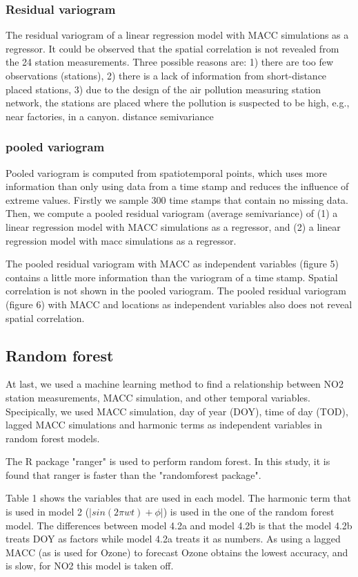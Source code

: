 \documentclass{article}
\begin{document}
 
\subsubsection{Residual variogram} 
The residual variogram of a linear regression model with MACC simulations as a regressor.
It could be observed that the spatial correlation is not revealed from the 24 station measurements. Three
possible reasons are: 1) there are too few observations (stations), 2) there is a lack of information from
short-distance placed stations, 3) due to the design of the air pollution measuring station network, the stations are placed where the pollution is suspected to be high, e.g., near factories, in a canyon.
distance semivariance
 
\subsubsection{pooled variogram}
Pooled variogram is computed from spatiotemporal points, which uses more information than only using data
from a time stamp and reduces the influence of extreme values.
Firstly we sample 300 time stamps that contain no missing data. Then, we compute a pooled residual variogram (average semivariance) of (1) a linear regression model with MACC simulations as a regressor, and (2) a linear regression model with macc simulations as a regressor.

The pooled residual variogram with MACC as independent variables (figure 5) contains a little more
information than the variogram of a time stamp. Spatial correlation is not shown in the pooled variogram.
The pooled residual variogram (figure 6) with MACC and locations as independent variables also does not
reveal spatial correlation.

\subsection{Random forest}

At last, we used a machine learning method to find a relationship between NO2 station measurements, MACC simulation, and other temporal variables. Specipically, we used MACC simulation,  day of year (DOY), time of day (TOD), lagged MACC simulations and harmonic terms as independent variables in random forest models.  

The R package "ranger" is used to perform random forest. In this study, it is found that ranger is faster than the "randomforest package". 

 Table 1 shows the variables that are used in each model. The harmonic term that is used in model 2  ($|sin(2 \pi wt) + \phi|$) is used in the one of the random forest model. The differences between model 4.2a and model 4.2b is that the model 4.2b treats DOY as factors while model 4.2a treats it as numbers. As using a lagged MACC (as is used for Ozone) to forecast Ozone obtains the lowest accuracy, and is slow, for NO2 this model is taken off.  
\end{document}
